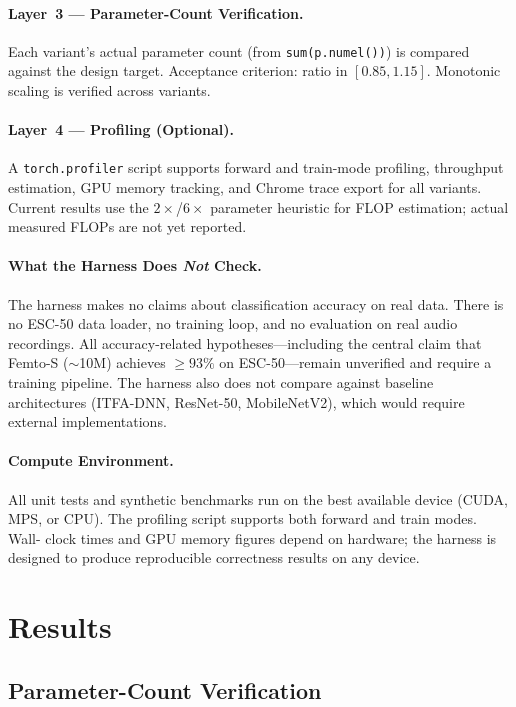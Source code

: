 \documentclass{article}
\begin{document}
\paragraph{Layer~3 --- Parameter-Count Verification.}
Each variant's actual parameter count (from \texttt{sum(p.numel())}) is
compared against the design target. Acceptance criterion: ratio in $[0.85, 1.15]$.
Monotonic scaling is verified across variants.

\paragraph{Layer~4 --- Profiling (Optional).}
A \texttt{torch.profiler} script supports forward and train-mode profiling,
throughput estimation, GPU memory tracking, and Chrome trace export for all
variants. Current results use the $2\times$/$6\times$ parameter heuristic for
FLOP estimation; actual measured FLOPs are not yet reported.

\paragraph{What the Harness Does \emph{Not} Check.}
The harness makes no claims about classification accuracy on real data. There
is no ESC-50 data loader, no training loop, and no evaluation on real audio
recordings. All accuracy-related hypotheses---including the central claim
that Femto-S ($\sim$10M) achieves $\geq 93\%$ on ESC-50---remain unverified
and require a training pipeline. The harness also does not compare against
baseline architectures (ITFA-DNN, ResNet-50, MobileNetV2), which would require
external implementations.

\paragraph{Compute Environment.}
All unit tests and synthetic benchmarks run on the best available device (CUDA,
MPS, or CPU). The profiling script supports both forward and train modes. Wall-
clock times and GPU memory figures depend on hardware; the harness is designed
to produce reproducible correctness results on any device.

\section{Results}

\subsection{Parameter-Count Verification}
\end{document}
